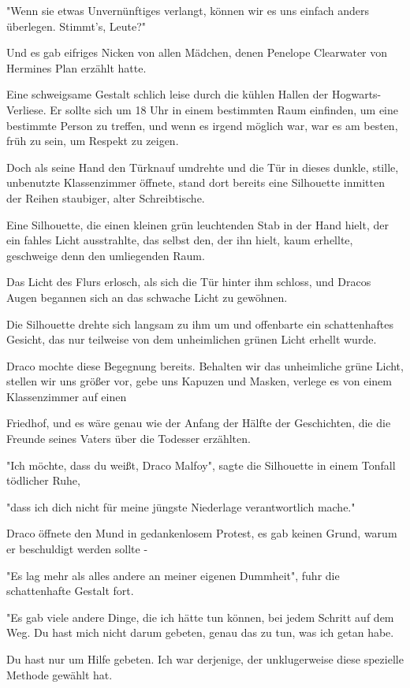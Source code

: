{"Wenn sie etwas Unvernünftiges verlangt, können wir es uns einfach anders überlegen. Stimmt's, Leute?"

Und es gab eifriges Nicken von allen Mädchen, denen Penelope Clearwater von Hermines Plan erzählt hatte.

Eine schweigsame Gestalt schlich leise durch die kühlen Hallen der Hogwarts-Verliese. Er sollte sich um 18 Uhr in einem bestimmten Raum einfinden, um eine bestimmte Person zu treffen, und wenn es irgend möglich war, war es am besten, früh zu sein, um Respekt zu zeigen.

Doch als seine Hand den Türknauf umdrehte und die Tür in dieses dunkle, stille, unbenutzte Klassenzimmer öffnete, stand dort bereits eine Silhouette inmitten der Reihen staubiger, alter Schreibtische.

Eine Silhouette, die einen kleinen grün leuchtenden Stab in der Hand hielt, der ein fahles Licht ausstrahlte, das selbst den, der ihn hielt, kaum erhellte, geschweige denn den umliegenden Raum.

Das Licht des Flurs erlosch, als sich die Tür hinter ihm schloss, und Dracos Augen begannen sich an das schwache Licht zu gewöhnen.

Die Silhouette drehte sich langsam zu ihm um und offenbarte ein schattenhaftes Gesicht, das nur teilweise von dem unheimlichen grünen Licht erhellt wurde.

Draco mochte diese Begegnung bereits. Behalten wir das unheimliche grüne Licht, stellen wir uns größer vor, gebe uns Kapuzen und Masken, verlege es von einem Klassenzimmer auf einen

Friedhof, und es wäre genau wie der Anfang der Hälfte der Geschichten, die die Freunde seines Vaters über die Todesser erzählten.

"Ich möchte, dass du weißt, Draco Malfoy", sagte die Silhouette in einem Tonfall tödlicher Ruhe,

"dass ich dich nicht für meine jüngste Niederlage verantwortlich mache."

Draco öffnete den Mund in gedankenlosem Protest, es gab keinen Grund, warum er beschuldigt werden sollte -

"Es lag mehr als alles andere an meiner eigenen Dummheit", fuhr die schattenhafte Gestalt fort.

"Es gab viele andere Dinge, die ich hätte tun können, bei jedem Schritt auf dem Weg. Du hast mich nicht darum gebeten, genau das zu tun, was ich getan habe.

Du hast nur um Hilfe gebeten. Ich war derjenige, der unklugerweise diese spezielle Methode gewählt hat.

}
